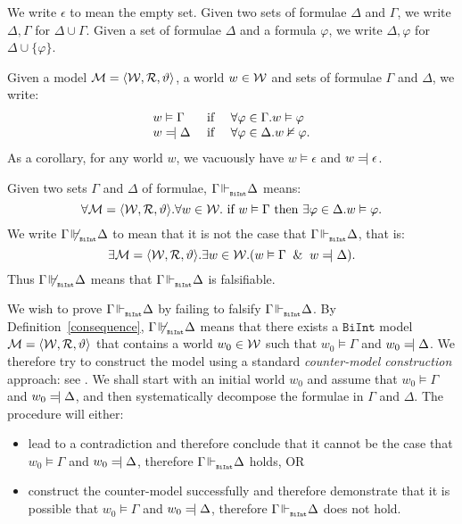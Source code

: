 \documentclass{llncs}
\numberwithin{equation}{section}
\newcommand{\Lg}[1]{\mathtt{#1}}
\newcommand{\Force}{\vDash}
\newcommand{\NotForce}{\nvDash}
\def\Reject{=\joinrel\mathrel|}
\newcommand{\mycal}[1]{
        {\cal{#1}}
}
\newcommand{\Model}{
        \mycal{M}=\langle \mycal{W}, \mycal{R}, \vartheta \rangle
}
\newcommand {\BiInt}{
        \Lg{BiInt}
}
\newcommand{\entails}{\hspace{-0.05cm}\Vdash_{_{\BiInt}}\hspace{-0.1cm}}
\begin{document}
We write $\epsilon$ to mean the empty set. Given two sets of formulae $\Delta$ and $\Gamma$, we write $\Delta , \Gamma$ for $\Delta \cup \Gamma$. Given a set of formulae $\Delta$ and a formula $\varphi$, we write $\Delta , \varphi$ for $\Delta \cup \{ \varphi \}$.

\begin{definition}
Given a model $\Model$, a world $w \in \mycal{W}$ and sets of formulae $\Gamma$ and $\Delta$, we write:
$$
\begin{array}{lll}
	w \Force \Gamma			&		\text{ if }	&		\forall \varphi \in \Gamma . w \Force \varphi \\
	w \Reject \Delta	&		\text{ if }	&		\forall \varphi \in \Delta . w \NotForce \varphi. \\
\end{array}
$$
As a corollary, for any world $w$, we vacuously have $w \Force \epsilon$ and $w \Reject \epsilon$.
\end{definition}

\begin{definition}[Consequence]\label{consequence}
Given two sets $\Gamma$ and $\Delta$ of formulae, $\Gamma \entails \Delta$ means:
$$\forall \Model . \forall w \in \mycal{W} . \text{ if } w \Force \Gamma \text { then } \exists \varphi \in \Delta . w \Force \varphi.$$
We write $\Gamma \not\entails \Delta$ to mean that it is not the case that $\Gamma \entails \Delta$, that is:
$$ \exists \Model . \exists w \in \mycal{W} . (w \Force \Gamma \And w \Reject \Delta).$$
Thus $\Gamma \not\entails \Delta$ means that $\Gamma \entails \Delta$ is falsifiable.
\end{definition}

We wish to prove $\Gamma \entails \Delta$ by failing to falsify $\Gamma \entails \Delta$. By Definition~\ref{consequence}, $\Gamma \not\entails \Delta$ means that there exists a $\BiInt$ model $\Model$ that contains a world $w_0 \in \mycal{W}$ such that $w_0 \Force \Gamma$ and $w_0 \Reject \Delta$. We therefore try to construct the model using a standard \textit{counter-model construction} approach: see \cite{gallier1986}. We shall start with an initial world $w_0$ and assume that $w_0 \Force \Gamma$ and $w_0 \Reject \Delta$, and then systematically decompose the formulae in $\Gamma$ and $\Delta$. The procedure will either:
	\begin{itemize}
		\item lead to a contradiction and therefore conclude that it cannot be the case that $w_0 \Force \Gamma$ and $w_0 \Reject \Delta$, therefore $\Gamma \entails \Delta$ holds, OR
		\item construct the counter-model successfully and therefore demonstrate that it is possible that $w_0 \Force \Gamma$ and $w_0 \Reject \Delta$, therefore $\Gamma \entails \Delta$ does not hold.
	\end{itemize}
\end{document}
